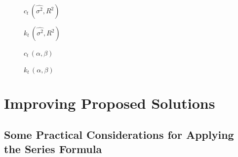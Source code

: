 \documentclass[12pt]{article}
\begin{document}
\begin{figure}
  \centering
  \caption{$c_t\, (\hat{\sigma^2},R^2)$ \label{fig:forc}}
  
\end{figure}


\begin{figure}
  \centering
  \caption{$k_t\, (\hat{\sigma^2},R^2) $   \label{fig:fork} }

\end{figure}



\begin{figure}
  \centering
  \caption{$c_t\, (\alpha,\beta)$ \label{fig:forcn}}
  
\end{figure}


\begin{figure}
  \centering
  \caption{$k_t\, (\alpha,\beta) $   \label{fig:forkn} }

\end{figure}






\clearpage
\section{Improving Proposed  Solutions}
\label{sec:algoforsoln}


\subsection{Some Practical Considerations for Applying the Series Formula}
\label{sec:practicalformula}
\end{document}
